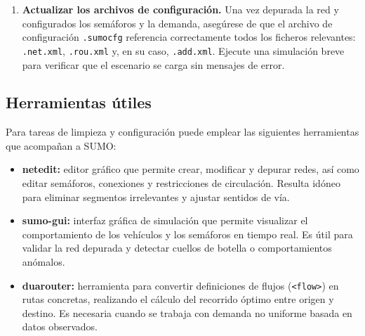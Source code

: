 \begin{enumerate}
\begin{verbatim}
<routes>
  <vType id="car" accel="2.6" decel="4.5" length="5" maxSpeed="13.9"/>
  <flow id="f1" begin="0" end="900" vehsPerHour="600" type="car"
        from="edgeWest" to="edgeEast"/>
</routes>
\end{verbatim}

    Estas definiciones permiten controlar la intensidad y dirección del
    tráfico, así como simular distintos tipos de vehículos (coches,
    autobuses, motocicletas, etc.). Tras ajustar la demanda, use
    \texttt{duarouter} para convertir los flujos en rutas específicas
    si fuera necesario.

  \item \textbf{Actualizar los archivos de configuración.} Una vez
    depurada la red y configurados los semáforos y la demanda,
    asegúrese de que el archivo de configuración \texttt{.sumocfg}
    referencia correctamente todos los ficheros relevantes:
    \texttt{.net.xml}, \texttt{.rou.xml} y, en su caso,
    \texttt{.add.xml}. Ejecute una simulación breve para verificar
    que el escenario se carga sin mensajes de error.
\end{enumerate}

\subsection*{Herramientas útiles}

Para tareas de limpieza y configuración puede emplear las siguientes
herramientas que acompañan a SUMO:

\begin{itemize}
  \item \textbf{netedit:} editor gráfico que permite crear, modificar
    y depurar redes, así como editar semáforos, conexiones y
    restricciones de circulación. Resulta idóneo para eliminar
    segmentos irrelevantes y ajustar sentidos de vía.
  \item \textbf{sumo-gui:} interfaz gráfica de simulación que permite
    visualizar el comportamiento de los vehículos y los semáforos en
    tiempo real. Es útil para validar la red depurada y detectar
    cuellos de botella o comportamientos anómalos.
  \item \textbf{duarouter:} herramienta para convertir definiciones de
    flujos (\verb|<flow>|) en rutas concretas, realizando el cálculo
    del recorrido óptimo entre origen y destino. Es necesaria cuando
    se trabaja con demanda no uniforme basada en datos observados.
\end{itemize}


